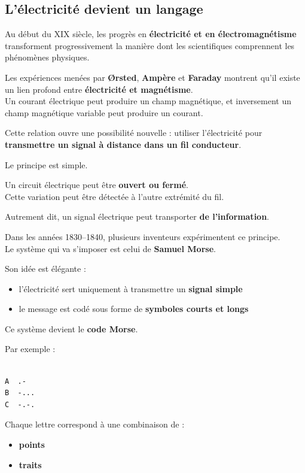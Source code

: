 \documentclass[
  french,
]{article}
\providecommand{\tightlist}{%
  \setlength{\itemsep}{0pt}\setlength{\parskip}{0pt}}
\begin{document}
\subsection{L'électricité devient un
langage}\label{luxe9lectricituxe9-devient-un-langage}

Au début du XIX siècle, les progrès en \textbf{électricité et en
électromagnétisme} transforment progressivement la manière dont les
scientifiques comprennent les phénomènes physiques.

Les expériences menées par \textbf{Ørsted}, \textbf{Ampère} et
\textbf{Faraday} montrent qu'il existe un lien profond entre
\textbf{électricité et magnétisme}.\\
Un courant électrique peut produire un champ magnétique, et inversement
un champ magnétique variable peut produire un courant.

Cette relation ouvre une possibilité nouvelle : utiliser l'électricité
pour \textbf{transmettre un signal à distance dans un fil conducteur}.

Le principe est simple.

Un circuit électrique peut être \textbf{ouvert ou fermé}.\\
Cette variation peut être détectée à l'autre extrémité du fil.

Autrement dit, un signal électrique peut transporter \textbf{de
l'information}.

Dans les années 1830--1840, plusieurs inventeurs expérimentent ce
principe.\\
Le système qui va s'imposer est celui de \textbf{Samuel Morse}.

Son idée est élégante :

\begin{itemize}
\tightlist
\item
  l'électricité sert uniquement à transmettre un \textbf{signal simple}
\item
  le message est codé sous forme de \textbf{symboles courts et longs}
\end{itemize}

Ce système devient le \textbf{code Morse}.

Par exemple :

\begin{verbatim}

A  .-
B  -...
C  -.-.
\end{verbatim}

Chaque lettre correspond à une combinaison de :

\begin{itemize}
\tightlist
\item
  \textbf{points}
\item
  \textbf{traits}
\end{itemize}
\end{document}
